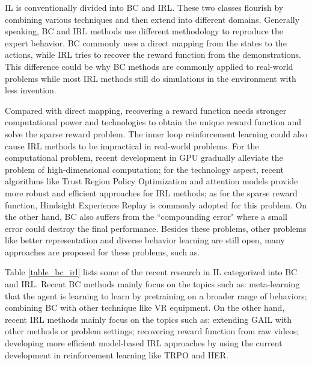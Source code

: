 \documentclass[acmsmall]{acmart}
\begin{document}
IL is conventionally divided into BC and IRL. These two classes flourish by combining various techniques and then extend into different domains. Generally speaking, BC and IRL methods use different methodology to reproduce the expert behavior. BC commonly uses a direct mapping from the states to the actions, while IRL tries to recover the reward function from the demonstrations. This difference could be why BC methods are commonly applied to real-world problems while most IRL methods still do simulations in the environment with less invention.

Compared with direct mapping, recovering a reward function needs stronger computational power and technologies to obtain the unique reward function and solve the sparse reward problem. The inner loop reinforcement learning could also cause IRL methods to be impractical in real-world problems. For the computational problem, recent development in GPU gradually alleviate the problem of high-dimensional computation; for the technology aspect, recent algorithms like Trust Region Policy Optimization\cite{schulmanTrustRegionPolicy2017} and attention models\cite{hufinegrained2020} provide more robust and efficient approaches for IRL methods; as for the sparse reward function, Hindsight Experience Replay\cite{andrychowicz2017hindsight} is commonly adopted for this problem. On the other hand, BC also suffers from the ``compounding error"\cite{rossReductionImitationLearning2011} where a small error could destroy the final performance. Besides these problems, other problems like better representation and diverse behavior learning are still open, many approaches are proposed for these problems, such as\cite{wangRobustImitationDiverse2017,liu2019ahng,hussein2021robust}. 

Table \ref{table_bc_irl} lists some of the recent research in IL categorized into BC and IRL. Recent BC methods mainly focus on the topics such as: meta-learning that the agent is learning to learn by pretraining on a broader range of behaviors\cite{duanOneShotImitationLearning2017}; combining BC with other technique like VR equipment\cite{zhangDeepImitationLearning2018}. On the other hand, recent IRL methods mainly focus on the topics such as: extending GAIL with other methods or problem settings\cite{dingGoalconditionedImitationLearning2019}; recovering reward function from raw videos\cite{aytarPlayingHardExploration2018}; developing more efficient model-based IRL approaches by using the current development in reinforcement learning like TRPO\cite{schulmanTrustRegionPolicy2017} and HER\cite{andrychowicz2017hindsight}.
\end{document}
